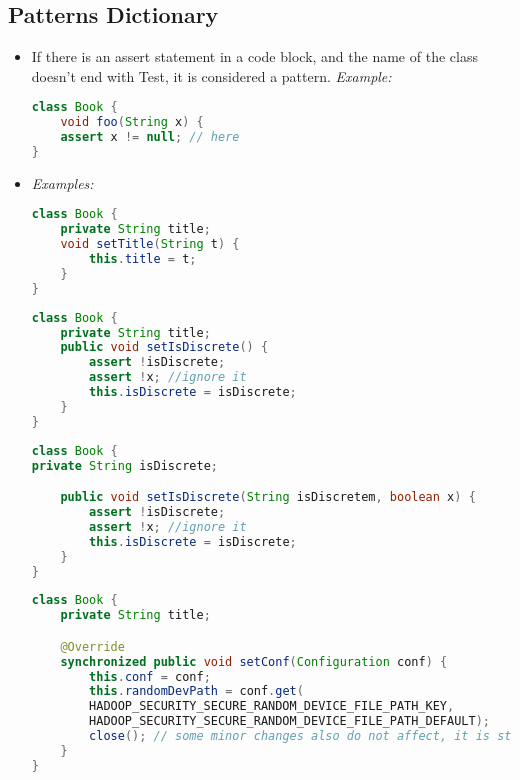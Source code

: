 
\subsection*{Patterns Dictionary}

\begin{itemize}
	\item {}
	{If there is an assert statement in a code block, and the name of the class doesn't end with Test, it is considered a pattern.}
	{\it Example:}
\begin{lstlisting}[language=Java]
class Book {
	void foo(String x) {
	assert x != null; // here
}
\end{lstlisting}

	\item {}
	{\it Examples:}
\begin{lstlisting}[language=Java]
class Book {
	private String title;
	void setTitle(String t) {
		this.title = t;
	}
}
\end{lstlisting}

\begin{lstlisting}[language=Java]
class Book {
	private String title;
	public void setIsDiscrete() {
		assert !isDiscrete;
		assert !x; //ignore it
		this.isDiscrete = isDiscrete;
	}
}
\end{lstlisting}

\begin{lstlisting}[language=Java]
class Book {
private String isDiscrete;

	public void setIsDiscrete(String isDiscretem, boolean x) {
		assert !isDiscrete;
		assert !x; //ignore it
		this.isDiscrete = isDiscrete;
	}
}
\end{lstlisting}

\begin{lstlisting}[language=Java]
class Book {
	private String title;

	@Override
	synchronized public void setConf(Configuration conf) {
		this.conf = conf;
		this.randomDevPath = conf.get(
		HADOOP_SECURITY_SECURE_RANDOM_DEVICE_FILE_PATH_KEY,
		HADOOP_SECURITY_SECURE_RANDOM_DEVICE_FILE_PATH_DEFAULT);
		close(); // some minor changes also do not affect, it is still Setter pattern
	}
}
\end{lstlisting}


\end{itemize}
